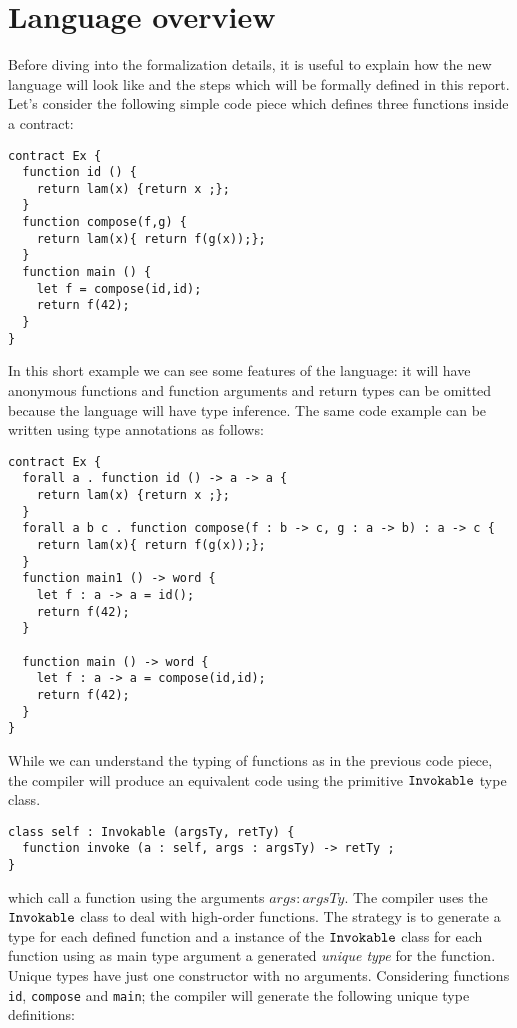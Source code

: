 \documentclass[a4paper, 11pt]{article}
\theoremstyle{definition}
\begin{document}
\section{Language overview} 

Before diving into the formalization details, it 
is useful to explain how the new language will look like 
and the steps which will be formally defined in this 
report. Let's consider the following simple code 
piece which defines three functions inside a contract:

\begin{lstlisting}[language=solidity]
contract Ex {
  function id () {
    return lam(x) {return x ;};
  }
  function compose(f,g) {
    return lam(x){ return f(g(x));};
  }
  function main () {
    let f = compose(id,id);
    return f(42);
  }
}
\end{lstlisting}

In this short example we can see some features of the \solidity{}
language: it will have anonymous functions and 
function arguments and return types can be omitted because 
the language will have type inference. The same code 
example can be written using type annotations as follows:

\begin{lstlisting}[language=solidity]
contract Ex {
  forall a . function id () -> a -> a {
    return lam(x) {return x ;};
  }
  forall a b c . function compose(f : b -> c, g : a -> b) : a -> c {
    return lam(x){ return f(g(x));};
  }
  function main1 () -> word {
    let f : a -> a = id();
    return f(42);
  }
  
  function main () -> word {
    let f : a -> a = compose(id,id);
    return f(42);
  }
}
\end{lstlisting}

While we can understand the typing of functions as in the previous
code piece, the \solidity{} compiler will produce an equivalent 
code using the primitive $\mathtt{Invokable}$ type class. 

\begin{lstlisting}[language=solidity]
class self : Invokable (argsTy, retTy) {
  function invoke (a : self, args : argsTy) -> retTy ;
}
\end{lstlisting}
which call a function using the arguments $args : argsTy$. The compiler 
uses the $\mathtt{Invokable}$ class to deal with high-order functions. The 
strategy is to generate a type for each defined function and a 
instance of the $\mathtt{Invokable}$ class for each function using as main 
type argument a generated \emph{unique type} for the function. 
Unique types have just one constructor with no arguments. Considering 
functions \texttt{id}, \texttt{compose} and \texttt{main}; the compiler 
will generate the following unique type definitions:
\end{document}
